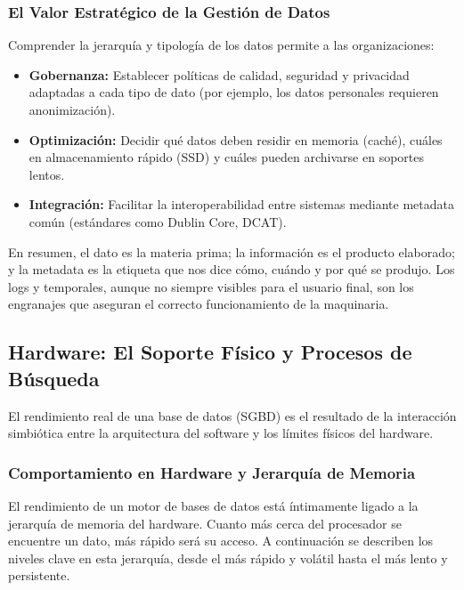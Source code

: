 \documentclass[12pt,a4paper,openany,oneside]{book}
\begin{document}
\subsubsection{El Valor Estratégico de la Gestión de Datos}

Comprender la jerarquía y tipología de los datos permite a las organizaciones:
\begin{itemize}
    \item \textbf{Gobernanza:} Establecer políticas de calidad, seguridad y privacidad adaptadas a cada tipo de dato (por ejemplo, los datos personales requieren anonimización).
    \item \textbf{Optimización:} Decidir qué datos deben residir en memoria (caché), cuáles en almacenamiento rápido (SSD) y cuáles pueden archivarse en soportes lentos.
    \item \textbf{Integración:} Facilitar la interoperabilidad entre sistemas mediante metadata común (estándares como Dublin Core, DCAT).
\end{itemize}

En resumen, el dato es la materia prima; la información es el producto elaborado; y la metadata es la etiqueta que nos dice cómo, cuándo y por qué se produjo. Los logs y temporales, aunque no siempre visibles para el usuario final, son los engranajes que aseguran el correcto funcionamiento de la maquinaria.





\subsection{Hardware: El Soporte Físico y Procesos de Búsqueda}

El rendimiento real de una base de datos (SGBD) es el resultado de la interacción simbiótica entre la arquitectura del software y los límites físicos del hardware.




\subsubsection{Comportamiento en Hardware y Jerarquía de Memoria}

El rendimiento de un motor de bases de datos está íntimamente ligado a la jerarquía de memoria del hardware. Cuanto más cerca del procesador se encuentre un dato, más rápido será su acceso. A continuación se describen los niveles clave en esta jerarquía, desde el más rápido y volátil hasta el más lento y persistente.
\end{document}
